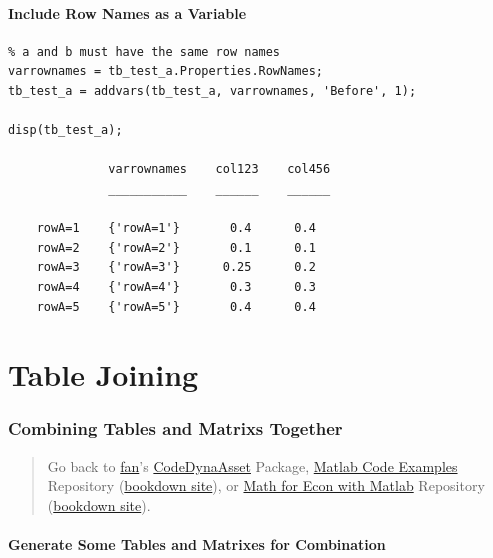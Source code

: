 \documentclass[
]{book}
\begin{document}
\hypertarget{include-row-names-as-a-variable}{%
\paragraph{Include Row Names as a Variable}\label{include-row-names-as-a-variable}}

\begin{verbatim}
% a and b must have the same row names
varrownames = tb_test_a.Properties.RowNames;
tb_test_a = addvars(tb_test_a, varrownames, 'Before', 1);

disp(tb_test_a);

              varrownames    col123    col456
              ___________    ______    ______

    rowA=1    {'rowA=1'}       0.4      0.4  
    rowA=2    {'rowA=2'}       0.1      0.1  
    rowA=3    {'rowA=3'}      0.25      0.2  
    rowA=4    {'rowA=4'}       0.3      0.3  
    rowA=5    {'rowA=5'}       0.4      0.4
\end{verbatim}

\hypertarget{table-joining}{%
\section{Table Joining}\label{table-joining}}

\hypertarget{combining-tables-and-matrixs-together}{%
\subsubsection{Combining Tables and Matrixs Together}\label{combining-tables-and-matrixs-together}}

\begin{quote}
Go back to \href{http://fanwangecon.github.io/}{fan}'s \href{https://fanwangecon.github.io/CodeDynaAsset/}{CodeDynaAsset} Package, \href{https://fanwangecon.github.io/M4Econ/}{Matlab Code Examples} Repository (\href{https://fanwangecon.github.io/M4Econ/bookdown}{bookdown site}), or \href{https://fanwangecon.github.io/Math4Econ/}{Math for Econ with Matlab} Repository (\href{https://fanwangecon.github.io/Math4Econ/bookdown}{bookdown site}).
\end{quote}

\hypertarget{generate-some-tables-and-matrixes-for-combination}{%
\paragraph{Generate Some Tables and Matrixes for Combination}\label{generate-some-tables-and-matrixes-for-combination}}
\end{document}
